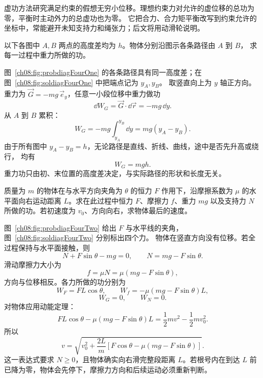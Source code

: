 {虚功方法研究满足约束的假想无穷小位移。理想约束力对允许的虚位移的总功为零，平衡时主动外力的总虚功也为零。
它把合力、合力矩平衡改写到约束允许的坐标中，常能避开未知支持力和绳张力；后文将用动滑轮说明。


\begin{origexamplebox}{}\label{ch08:ex:s10-4-1}
以下各图中 $A,B$ 两点的高度差均为 $h$。物体分别沿图示各条路径由 $A$ 到 $B$，
求每一过程中重力所做的功。
\probdiagFourOne
\end{origexamplebox}

\begin{xesolution}
图~\ref{ch08:fig:probdiagFourOne} 的各条路径具有同一高度差；在图~\ref{ch08:fig:soldiagFourOne} 中把端点记为 $y_A,y_B$。
取竖直向上为 $y$ 轴正方向。重力为 $\vec G=-mg\,\vec e_y$，任意一小段位移中重力做功
\[
 \dd W_G=\vec G\cdot\dd\vec r=-mg\,\dd y.
\]
从 $A$ 到 $B$ 累积：
\[
 W_G=-mg\int_{y_A}^{y_B}\dd y
 =mg(y_A-y_B).
\]
\soldiagFourOne
由于所有图中 $y_A-y_B=h$，无论路径是直线、折线、曲线，途中是否先升高或绕行，
均有
\[
 \boxed{W_G=mgh}.
\]
重力功只由初、末位置的高度差决定，与实际路径的形状和长度无关。
\end{xesolution}

\begin{origexamplebox}{}\label{ch08:ex:s10-4-2}
质量为 $m$ 的物体在与水平方向夹角为 $\theta$ 的恒力 $F$ 作用下，沿摩擦系数为
$\mu$ 的水平面向右运动距离 $L$。求在此过程中恒力 $F$、摩擦力 $f$、重力 $mg$
以及支持力 $N$ 所做的功。若初速度为 $v_0$、方向向右，求物体最后的速度。
\probdiagFourTwo
\end{origexamplebox}

\begin{xesolution}
图~\ref{ch08:fig:probdiagFourTwo} 给出 $F$ 与水平线的夹角，图~\ref{ch08:fig:soldiagFourTwo} 分别标出四个力。
物体在竖直方向没有位移。若全过程保持与水平面接触，则
\[
 N+F\sin\theta-mg=0,
 \qquad
 N=mg-F\sin\theta.
\]
滑动摩擦力大小为
\[
 f=\mu N=\mu(mg-F\sin\theta),
\]
方向与位移相反。各力所做的功分别为
\[
 \boxed{W_F=FL\cos\theta},
 \qquad
 \boxed{W_f=-\mu(mg-F\sin\theta)L},
\]
\[
 \boxed{W_G=0},
 \qquad
 \boxed{W_N=0}.
\]
\soldiagFourTwo
对物体应用动能定理：
\[
 FL\cos\theta-\mu(mg-F\sin\theta)L
 =\frac12mv^2-\frac12mv_0^2.
\]
所以
\[
 \boxed{
 v=\sqrt{v_0^2+\frac{2L}{m}
 \left[F\cos\theta-\mu(mg-F\sin\theta)\right]}}.
\]
这一表达式要求 $N\ge0$，且物体确实向右滑完整段距离 $L$。若根号内在到达 $L$ 前
已降为零，物体会先停下，摩擦力方向和后续运动必须重新判断。
\end{xesolution}

}
